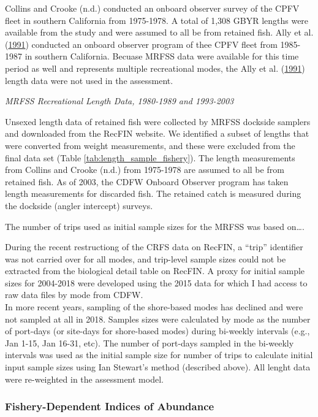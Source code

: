 \documentclass[12pt,]{article}
\begin{document}
Collins and Crooke (n.d.) conducted an onboard observer survey of the
CPFV fleet in southern California from 1975-1978. A total of 1,308 GBYR
lengths were available from the study and were assumed to all be from
retained fish. Ally et al. (\protect\hyperlink{ref-Ally1991}{1991})
conducted an onboard observer program of thee CPFV fleet from 1985-1987
in southern California. Becuase MRFSS data were available for this time
period as well and represents multiple recreational modes, the Ally et
al. (\protect\hyperlink{ref-Ally1991}{1991}) length data were not used
in the assessment.

\emph{MRFSS Recreational Length Data, 1980-1989 and 1993-2003}

Unsexed length data of retained fish were collected by MRFSS dockside
samplers and downloaded from the RecFIN website. We identified a subset
of lengths that were converted from weight measurements, and these were
excluded from the final data set (Table
\ref{tab:length_sample_fishery}). The length measurements from Collins
and Crooke (n.d.) from 1975-1978 are assumed to all be from retained
fish. As of 2003, the CDFW Onboard Observer program has taken length
measurements for discarded fish. The retained catch is measured during
the dockside (angler intercept) surveys.

The number of trips used as initial sample sizes for the MRFSS was based
on\ldots{}.

During the recent restructiong of the CRFS data on RecFIN, a ``trip''
identifier was not carried over for all modes, and trip-level sample
sizes could not be extracted from the biological detail table on RecFIN.
A proxy for initial sample sizes for 2004-2018 were developed using the
2015 data for which I had access to raw data files by mode from CDFW.\\
In more recent years, sampling of the shore-based modes has declined and
were not sampled at all in 2018. Samples sizes were calculated by mode
as the number of port-days (or site-days for shore-based modes) during
bi-weekly intervals (e.g., Jan 1-15, Jan 16-31, etc). The number of
port-days sampled in the bi-weekly intervals was used as the initial
sample size for number of trips to calculate initial input sample sizes
using Ian Stewart's method (described above). All lenght data were
re-weighted in the assessment model.

\subsubsection{Fishery-Dependent Indices of
Abundance}\label{fishery-dependent-indices-of-abundance}
\end{document}
